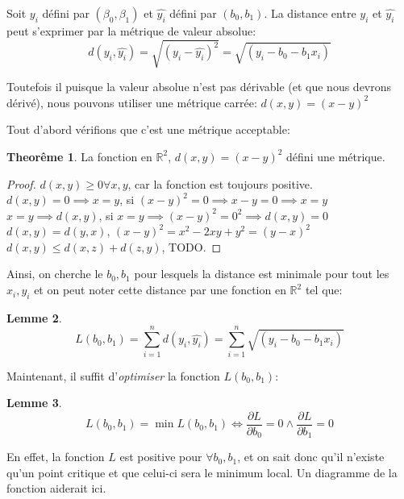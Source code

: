 \documentclass[12pt]{book}
\let\Bbb\mathbb
\theoremstyle{definition}
\newtheorem{theorem}{Theorême}[section]
\newtheorem{lemma}[theorem]{Lemme}
\begin{document}
Soit $y_i$ défini par $(\beta_0, \beta_1)$ et $\hat{y_i}$ défini par $(b_0, b_1)$. La distance entre $y_i$ et $\hat{y_i}$ peut s'exprimer
par la métrique de valeur absolue:
$$ d(y_i, \hat{y_i}) = \sqrt{(y_i - \hat{y_i})^2} = \sqrt{(y_i - b_0 - b_1x_i)} $$

Toutefois il puisque la valeur absolue n'est pas dérivable (et que nous devrons dérivé), nous pouvons
utiliser une métrique carrée: $d(x, y) = (x - y)^2$

Tout d'abord vérifions que c'est une métrique acceptable:
\begin{theorem}
    La fonction en $\Bbb R^2$, $d(x, y) = (x - y)^2$ défini une métrique.
\end{theorem}

\begin{proof}
    $d(x, y) \geq 0 \forall x,y$, car la fonction est toujours positive. \\
    $d(x, y) = 0 \implies x = y$, si $(x - y)^2 = 0 \implies x - y = 0 \implies x = y$ \\
    $x = y \implies d(x, y)$, si $x = y \implies (x - y)^ 2= 0^2 \implies d(x, y) = 0$ \\
    $d(x, y) = d(y, x)$, $(x - y)^2 = x^2 - 2xy + y^2 = (y - x)^2$ \\
    $d(x, y) \leq d(x, z) + d(z, y)$, TODO.
\end{proof}

Ainsi, on cherche le $b_0, b_1$ pour lesquels la distance est minimale pour tout les $x_i, y_i$ et on peut noter cette distance par une fonction 
en $\Bbb R^2$ tel que:
\begin{lemma}
    $$ L(b_0, b_1) = \sum_{i=1}^{n} d(y_i, \hat{y_i}) = \sum_{i=1}^{n} \sqrt{(y_i - b_0 - b_1x_i)} $$
\end{lemma}

Maintenant, il suffit d'\textit{optimiser} la fonction $L(b_0, b_1)$:

\begin{lemma}
    $$ L(b_0, b_1) = \min{L(b_0, b_1)} \iff \frac{\partial L}{\partial b_0} = 0 \land \frac{\partial L}{\partial b_1} = 0 $$
\end{lemma}

En effet, la fonction $L$ est positive pour $\forall b_0,b_1$, et on sait donc qu'il n'existe qu'un point critique et que celui-ci sera le minimum local.
Un diagramme de la fonction aiderait ici.
\end{document}
